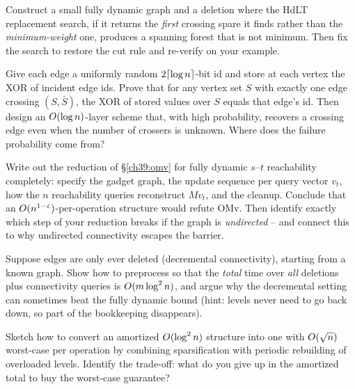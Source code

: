 \begin{exercise}
Construct a small fully dynamic graph and a deletion where the HdLT replacement
search, if it returns the \emph{first} crossing spare it finds rather than the
\emph{minimum-weight} one, produces a spanning forest that is not minimum. Then fix
the search to restore the cut rule and re-verify on your example.
\end{exercise}

\begin{exercise}
Give each edge a uniformly random $2\lceil\log n\rceil$-bit id and store at each
vertex the XOR of incident edge ids. Prove that for any vertex set $S$ with exactly
one edge crossing $(S,\bar S)$, the XOR of stored values over $S$ equals that
edge's id. Then design an $O(\log n)$-layer scheme that, with high probability,
recovers a crossing edge even when the number of crossers is unknown. Where does
the failure probability come from?
\end{exercise}

\begin{exercise}
Write out the reduction of \S\ref{ch39:omv} for fully dynamic $s$--$t$
reachability completely: specify the gadget graph, the update sequence per query
vector $v_t$, how the $n$ reachability queries reconstruct $Mv_t$, and the cleanup.
Conclude that an $O(n^{1-\varepsilon})$-per-operation structure would refute OMv. Then
identify exactly which step of your reduction breaks if the graph is
\emph{undirected} -- and connect this to why undirected connectivity escapes the
barrier.
\end{exercise}

\begin{exercise}
Suppose edges are only ever deleted (decremental connectivity), starting from a
known graph. Show how to preprocess so that the \emph{total} time over \emph{all}
deletions plus connectivity queries is $O(m\log^2 n)$, and argue why the
decremental setting can sometimes beat the fully dynamic bound (hint: levels never
need to go back down, so part of the bookkeeping disappears).
\end{exercise}

\begin{exercise}
Sketch how to convert an amortized $O(\log^2 n)$ structure into one with
$O(\sqrt n)$ worst-case per operation by combining sparsification with periodic
rebuilding of overloaded levels. Identify the trade-off: what do you give up in the
amortized total to buy the worst-case guarantee?
\end{exercise}

